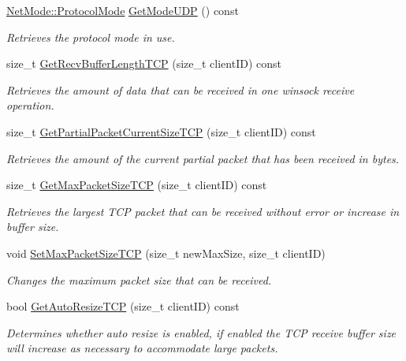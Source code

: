 \begin{DoxyCompactItemize}
\hyperlink{class_net_mode_a43cfa55ee6a4db66a8d7d6c27f766964}{NetMode::ProtocolMode} \hyperlink{class_net_instance_server_a70cdb75d88690871c7734b6ede603dc6}{GetModeUDP} () const 
\begin{DoxyCompactList}\small\item\em Retrieves the protocol mode in use. \item\end{DoxyCompactList}\item 
size\_\-t \hyperlink{class_net_instance_server_ad29f6ddf3371384372a16220e701fc23}{GetRecvBufferLengthTCP} (size\_\-t clientID) const 
\begin{DoxyCompactList}\small\item\em Retrieves the amount of data that can be received in one winsock receive operation. \item\end{DoxyCompactList}\item 
size\_\-t \hyperlink{class_net_instance_server_a0cace5b7658e0b77d9238ed2ed6c27a3}{GetPartialPacketCurrentSizeTCP} (size\_\-t clientID) const 
\begin{DoxyCompactList}\small\item\em Retrieves the amount of the current partial packet that has been received in bytes. \item\end{DoxyCompactList}\item 
size\_\-t \hyperlink{class_net_instance_server_abff9523871ba3f7b633cf52f6be9e2ed}{GetMaxPacketSizeTCP} (size\_\-t clientID) const 
\begin{DoxyCompactList}\small\item\em Retrieves the largest TCP packet that can be received without error or increase in buffer size. \item\end{DoxyCompactList}\item 
void \hyperlink{class_net_instance_server_ae1d11752a5764fc2b5ba5ac201c4d25a}{SetMaxPacketSizeTCP} (size\_\-t newMaxSize, size\_\-t clientID)
\begin{DoxyCompactList}\small\item\em Changes the maximum packet size that can be received. \item\end{DoxyCompactList}\item 
bool \hyperlink{class_net_instance_server_a686365235a9ec94764d237c889f14b43}{GetAutoResizeTCP} (size\_\-t clientID) const 
\begin{DoxyCompactList}\small\item\em Determines whether auto resize is enabled, if enabled the TCP receive buffer size will increase as necessary to accommodate large packets. \item\end{DoxyCompactList}\item 

\end{DoxyCompactItemize}
